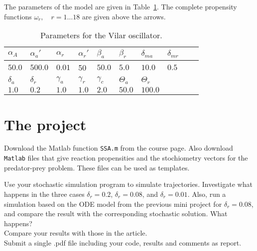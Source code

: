 \documentclass[a4paper,11pt]{article}
\newcounter{ex}
\begin{document}
\noindent
The parameters of the model are given in Table~\ref{tab:vilar}. The complete propensity functions $\omega_r, \quad r=1\ldots 18$ are given above the arrows.  

\begin{table}[H]
\begin{center}
\begin{tabular}{llllllllll}
\hline
$\alpha_A$ & $\alpha_{a}'$ & $\alpha_r$ & $\alpha_{r}'$ & $\beta_a$ & $\beta_r$ & $\delta_{ma}$ & $\delta_{mr}$\\
\hline
$50.0$ & $500.0$ & $0.01$ &50 & $50.0$ & $5.0$ & $10.0$ & $0.5$\\
\hline
$\delta_a$& $\delta_r$ & $\gamma_a$ & $\gamma_r$ & $\gamma_c$ & $\Theta_a$ & $\Theta_r$\\
\hline
$1.0$ & $0.2$ & $1.0$ & $1.0$ & $2.0$ & $50.0$ & $100.0$\\
\hline
\end{tabular}
\end{center}
\caption{Parameters for the Vilar oscillator.}
\label{tab:vilar}
\end{table}

\section{The project}
Download the Matlab function {\tt SSA.m} from the course page. Also download \texttt{Matlab} files that give reaction propensities and the stochiometry vectors for the predator-prey problem. These files can be used as templates.

\noindent Use your stochastic simulation program to simulate trajectories. Investigate what happens in the three cases $\delta_r=0.2$, $\delta_r=0.08$, and $\delta_r=0.01$. Also, run a simulation based on the ODE model from the previous mini project for $\delta_r=0.08$, and compare the result with the corresponding stochastic solution. What happens? \\
Compare your results with those in the article.\\

\noindent Submit a single .pdf file including your code, results and comments as report.
\end{document}

